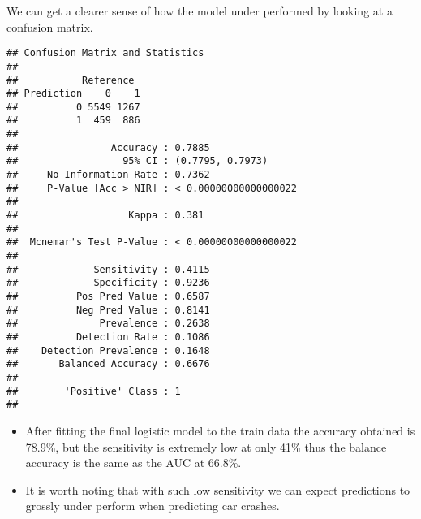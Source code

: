 \documentclass[
]{article}
\newenvironment{Shaded}{\begin{snugshade}}{\end{snugshade}}
\newcommand{\AttributeTok}[1]{\textcolor[rgb]{0.77,0.63,0.00}{#1}}
\newcommand{\FunctionTok}[1]{\textcolor[rgb]{0.00,0.00,0.00}{#1}}
\newcommand{\NormalTok}[1]{#1}
\newcommand{\SpecialCharTok}[1]{\textcolor[rgb]{0.00,0.00,0.00}{#1}}
\newcommand{\StringTok}[1]{\textcolor[rgb]{0.31,0.60,0.02}{#1}}
\providecommand{\tightlist}{%
  \setlength{\itemsep}{0pt}\setlength{\parskip}{0pt}}
\begin{document}
We can get a clearer sense of how the model under performed by looking
at a confusion matrix.

\begin{Shaded}
\end{Shaded}

\begin{verbatim}
## Confusion Matrix and Statistics
## 
##           Reference
## Prediction    0    1
##          0 5549 1267
##          1  459  886
##                                                
##                Accuracy : 0.7885               
##                  95% CI : (0.7795, 0.7973)     
##     No Information Rate : 0.7362               
##     P-Value [Acc > NIR] : < 0.00000000000000022
##                                                
##                   Kappa : 0.381                
##                                                
##  Mcnemar's Test P-Value : < 0.00000000000000022
##                                                
##             Sensitivity : 0.4115               
##             Specificity : 0.9236               
##          Pos Pred Value : 0.6587               
##          Neg Pred Value : 0.8141               
##              Prevalence : 0.2638               
##          Detection Rate : 0.1086               
##    Detection Prevalence : 0.1648               
##       Balanced Accuracy : 0.6676               
##                                                
##        'Positive' Class : 1                    
## 
\end{verbatim}

\begin{itemize}
\tightlist
\item
  After fitting the final logistic model to the train data the accuracy
  obtained is 78.9\%, but the sensitivity is extremely low at only 41\%
  thus the balance accuracy is the same as the AUC at 66.8\%.
\item
  It is worth noting that with such low sensitivity we can expect
  predictions to grossly under perform when predicting car crashes.
\end{itemize}
\end{document}
